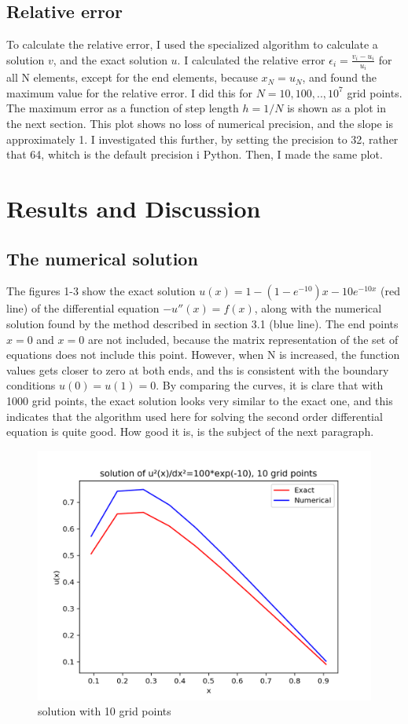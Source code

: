 \documentclass{article}
\begin{document}
\subsection{Relative error}
To calculate the relative error, I used the specialized algorithm to calculate a solution $v$, and the exact solution $u$. I calculated the relative error $\epsilon_i = \frac{v_i-u_i}{u_i}$ for all N elements, except for the end elements, because $x_N=u_N$, and found the maximum value for the relative error. I did this for $ N=10, 100, .., 10^{7}$  grid points. The maximum error as a function of step length $h=1/N$ is shown as a plot in the next section. This plot shows no loss of numerical precision, and the slope is approximately 1. I investigated this further, by setting the precision to 32, rather that 64, whitch is the default precision i Python. Then, I made the same plot. 


\section{Results and Discussion}
\subsection{The numerical solution}
The figures 1-3 show the exact solution $u(x)=1-(1-e^{-10})x-10e^{-10x} $ (red line) of the differential equation $-u''(x)=f(x)$, along with the numerical solution found by the method described in section 3.1 (blue line). The end points $x=0$ and $x=0$ are not included, because the matrix representation of the set of equations does not include this point. However, when N is increased, the function values gets closer to zero at both ends, and ths is consistent with the boundary conditions $u(0)=u(1)=0$. By comparing the curves, it is clare that with 1000 grid points, the exact solution looks very similar to the exact one, and this indicates that the algorithm used here for solving the second order differential equation is quite good. How good it is, is the subject of the next paragraph. 
\begin{figure}
  \includegraphics[width=\linewidth]{10gridpoints.png}
  \caption{solution with 10 grid points}
  \label{fig:10 grid points}
\end{figure}
\end{document}
